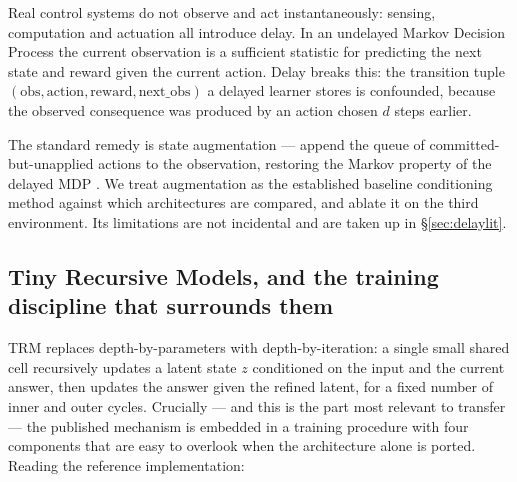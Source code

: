 \documentclass[11pt]{article}
\begin{document}
Real control systems do not observe and act instantaneously: sensing, computation and actuation all introduce delay. In an undelayed Markov Decision Process the current observation is a sufficient statistic for predicting the next state and reward given the current action. Delay breaks this: the transition tuple $(\text{obs}, \text{action}, \text{reward}, \text{next\_obs})$ a delayed learner stores is confounded, because the observed consequence was produced by an action chosen $d$ steps earlier.

The standard remedy is state augmentation --- append the queue of committed-but-unapplied actions to the observation, restoring the Markov property of the delayed MDP \citep{katsikopoulos2003delayed}. We treat augmentation as the established baseline conditioning method against which architectures are compared, and ablate it on the third environment. Its limitations are not incidental and are taken up in \S\ref{sec:delaylit}.

\subsection{Tiny Recursive Models, and the training discipline that surrounds them}
\label{sec:trmdiscipline}

TRM replaces depth-by-parameters with depth-by-iteration: a single small shared cell recursively updates a latent state $z$ conditioned on the input and the current answer, then updates the answer given the refined latent, for a fixed number of inner and outer cycles. Crucially --- and this is the part most relevant to transfer --- the published mechanism is embedded in a training procedure with four components that are easy to overlook when the architecture alone is ported. Reading the reference implementation:
\end{document}
